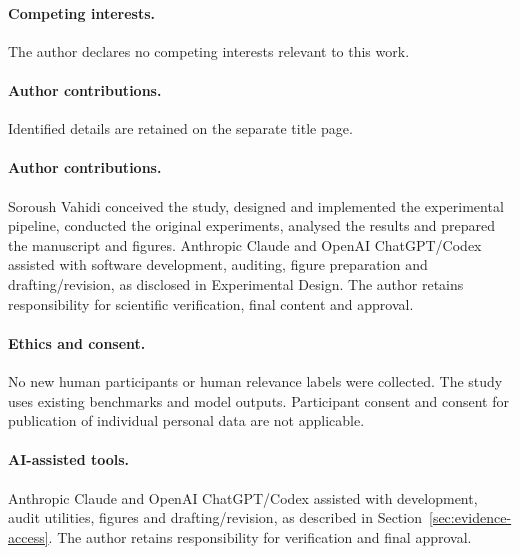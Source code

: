 \paragraph{Competing interests.}
The author declares no competing interests relevant to this work.
\ifdefined\AnonymousVersion
\paragraph{Author contributions.} Identified details are retained on the separate title page.
\else
\paragraph{Author contributions.}
Soroush Vahidi conceived the study, designed and implemented the experimental pipeline, conducted the original experiments, analysed the results and prepared the manuscript and figures. Anthropic Claude and OpenAI ChatGPT/Codex assisted with software development, auditing, figure preparation and drafting/revision, as disclosed in Experimental Design. The author retains responsibility for scientific verification, final content and approval.
\fi
\paragraph{Ethics and consent.}
No new human participants or human relevance labels were collected. The study uses existing benchmarks and model outputs. Participant consent and consent for publication of individual personal data are not applicable.
\paragraph{AI-assisted tools.}
Anthropic Claude and OpenAI ChatGPT/Codex assisted with development, audit utilities, figures and drafting/revision, as described in Section~\ref{sec:evidence-access}. The author retains responsibility for verification and final approval.

